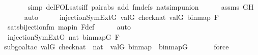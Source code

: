 \begin{isabellebody}
\ \ \ \ \ \isamarkupfalse%
\ {\isacharparenleft}{\kern0pt}simp\ del{\isacharcolon}{\kern0pt}FOL{\isacharunderscore}{\kern0pt}sats{\isacharunderscore}{\kern0pt}iff\ pair{\isacharunderscore}{\kern0pt}abs\ add{\isacharcolon}{\kern0pt}\ fm{\isacharunderscore}{\kern0pt}defs\ nat{\isacharunderscore}{\kern0pt}simp{\isacharunderscore}{\kern0pt}union{\isacharparenright}{\kern0pt}\isanewline
\ \ \ \ \isamarkupfalse%
\ assms\ GH\isanewline
\ \ \ \ \isamarkupfalse%
\ auto\isanewline
\ \ \isamarkupfalse%
\ \isamarkupfalse%
\ {\isachardoublequoteopen}injection{\isacharparenleft}{\kern0pt}{\isacharhash}{\kern0pt}{\isacharhash}{\kern0pt}SymExt{\isacharparenleft}{\kern0pt}G{\isacharparenright}{\kern0pt}{\isacharcomma}{\kern0pt}\ val{\isacharparenleft}{\kern0pt}G{\isacharcomma}{\kern0pt}\ check{\isacharparenleft}{\kern0pt}nat{\isacharparenright}{\kern0pt}{\isacharparenright}{\kern0pt}{\isacharcomma}{\kern0pt}\ val{\isacharparenleft}{\kern0pt}G{\isacharcomma}{\kern0pt}\ binmap{\isacharprime}{\kern0pt}{\isacharparenright}{\kern0pt}{\isacharcomma}{\kern0pt}\ F{\isacharparenright}{\kern0pt}{\isachardoublequoteclose}\ \isanewline
\ \ \ \ \isamarkupfalse%
\ sats{\isacharunderscore}{\kern0pt}bijection{\isacharunderscore}{\kern0pt}fm\ mapin\ F{\isacharunderscore}{\kern0pt}def\isanewline
\ \ \ \ \isamarkupfalse%
\ auto\isanewline
\ \ \isamarkupfalse%
\ \isamarkupfalse%
\ {\isachardoublequoteopen}injection{\isacharparenleft}{\kern0pt}{\isacharhash}{\kern0pt}{\isacharhash}{\kern0pt}SymExt{\isacharparenleft}{\kern0pt}G{\isacharparenright}{\kern0pt}{\isacharcomma}{\kern0pt}\ nat{\isacharcomma}{\kern0pt}\ binmap{\isacharparenleft}{\kern0pt}G{\isacharparenright}{\kern0pt}{\isacharcomma}{\kern0pt}\ F{\isacharparenright}{\kern0pt}{\isachardoublequoteclose}\ \isanewline
\ \ \ \ \isamarkupfalse%
{\isacharparenleft}{\kern0pt}subgoal{\isacharunderscore}{\kern0pt}tac\ {\isachardoublequoteopen}val{\isacharparenleft}{\kern0pt}G{\isacharcomma}{\kern0pt}\ check{\isacharparenleft}{\kern0pt}nat{\isacharparenright}{\kern0pt}{\isacharparenright}{\kern0pt}\ {\isacharequal}{\kern0pt}\ nat\ {\isasymand}\ val{\isacharparenleft}{\kern0pt}G{\isacharcomma}{\kern0pt}\ binmap{\isacharprime}{\kern0pt}{\isacharparenright}{\kern0pt}\ {\isacharequal}{\kern0pt}\ binmap{\isacharparenleft}{\kern0pt}G{\isacharparenright}{\kern0pt}{\isachardoublequoteclose}{\isacharparenright}{\kern0pt}\isanewline
\ \ \ \ \ \isamarkupfalse%
\ force\isanewline

\end{isabellebody}
